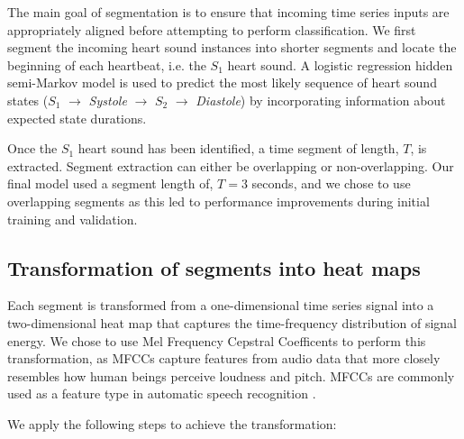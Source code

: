 \documentclass{article}
\begin{document}
The main goal of segmentation is to ensure that incoming time series inputs are appropriately aligned before attempting to perform classification. We first segment the incoming heart sound instances into shorter segments and locate the beginning of each heartbeat, i.e. the $S_1$ heart sound. A logistic regression hidden semi-Markov model \cite{springer2016logistic} is used to predict the most likely sequence of heart sound states ($S_1$  $\rightarrow$ \emph{Systole} $ \rightarrow$ $S_2$ $ \rightarrow$ \emph{Diastole}) by incorporating information about expected state durations. 

Once the $S_1$ heart sound has been identified, a time segment of length, $T$, is extracted. Segment extraction can either be overlapping or non-overlapping. Our final model used a segment length of, $T = 3$ seconds, and we chose to use overlapping segments as this led to performance improvements during initial training and validation.

\subsection{Transformation of segments into heat maps}

Each segment is transformed from a one-dimensional time series signal into a two-dimensional heat map that captures the time-frequency distribution of signal energy. We chose to use Mel Frequency Cepstral Coefficents \cite{davis1980comparison} to perform this transformation, as MFCCs capture features from audio data that more closely resembles how human beings perceive loudness and pitch. MFCCs are commonly used as a feature type in automatic speech recognition \cite{godino2004automatic}. 

We apply the following steps to achieve the transformation:
\end{document}
